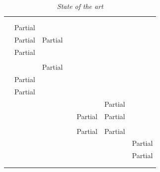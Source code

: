 \newcommand{\sotaCore}{\rowcolor{lightgray}
\cite{Ogheneovo2014} & Partial & \cmark & \cmark & \xmark & \xmark & \xmark \\
\cite{Tang2010} & Partial & Partial & \cmark & \xmark & \xmark & \xmark \\
\rowcolor{lightgray}
\cite{Sneed2004} & Partial & \cmark & \cmark & \xmark & \xmark & \xmark \\
\cite{Stojanov2017} & \xmark & \cmark & \cmark & \xmark & \xmark & \xmark \\
\rowcolor{lightgray}
\cite{Galster2019} & \cmark & Partial & \xmark & \xmark & \xmark & \xmark \\
\cite{Lenarduzzi2017} & Partial & \cmark & \cmark & \xmark & \xmark & \xmark \\
\rowcolor{lightgray}
\cite{Araujo2021} & Partial & \xmark & \cmark & \xmark & \xmark & \xmark \\	
\cite{Zhu2019} & \xmark & \xmark & \xmark & \cmark & Partial & \xmark \\
\rowcolor{lightgray}
\cite{Rong2018} & \xmark & \xmark & \xmark & Partial & Partial & \xmark \\
\cite{Zhu2015} & \xmark & \xmark & \xmark & \cmark & \cmark & \xmark \\
\rowcolor{lightgray}
\cite{Kherbouche2017} & \xmark & \xmark & \xmark & Partial & Partial & \xmark \\
\cite{Hasiloglu2018} & \xmark & \xmark & \xmark & \cmark & \cmark & Partial \\
\rowcolor{lightgray}
\cite{Slaninova2014} & \xmark & \xmark & \xmark & \cmark & \cmark & Partial \\
\cite{Waqar2017} & \xmark & \xmark & \xmark & \xmark & \xmark & \cmark \\
\rowcolor{lightgray}
\cite{Kumar2017} & \xmark & \xmark & \xmark & \xmark & \xmark & \cmark \\
}

\begin{table}[!htb]
	\centering
	\caption[State of the art]
	{\textit{State of the art}}
	\label{tbl:ch1_stateOfTheArt2}
	\begin{tabularx}{\textwidth}{cYYYYYY}
		\toprule
		 &  &  &  \\ 
		 \cmidrule(lr){2-4} \cmidrule(lr){5-6} \cmidrule(lr){7-7}
		 & \RaggedRight {} & \RaggedRight {} & \RaggedRight {} &  &  & \RaggedRight {} \\ 		
		\midrule
			\sotaCore
		\bottomrule
	\end{tabularx}	
\end{table}

